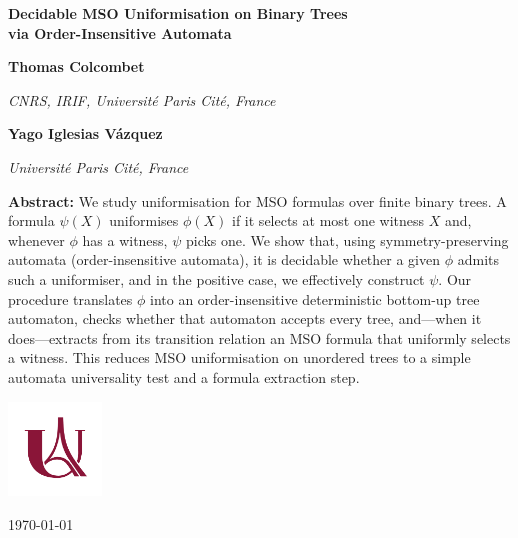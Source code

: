 \documentclass[twoside]{article}
\newcommand{\paperauthorone}{Thomas Colcombet}
\newcommand{\paperaffiliationone}{CNRS, IRIF, Université Paris Cité, France}
\newcommand{\paperauthortwo}{Yago Iglesias Vázquez}
\newcommand{\paperaffiliationtwo}{Université Paris Cité, France}
\begin{document}
\begin{titlingpage}
	\begin{center}
		{\LARGE \bfseries Decidable MSO Uniformisation on Binary Trees\\ via Order-Insensitive Automata\par}

		\vspace{2em}

		{\bfseries \paperauthorone \par}
		{\itshape \paperaffiliationone \par}
		\vspace{1em}

		{\bfseries \paperauthortwo \par}
		{\itshape \paperaffiliationtwo \par}

		\vspace{3em}

		\begin{minipage}{0.8\textwidth}
			\noindent
			\textbf{Abstract:}
			\small
			We study uniformisation for MSO formulas over finite binary trees. A formula $\psi(X)$ uniformises $\phi(X)$
			if it selects at most one witness $X$ and, whenever $\phi$ has a witness, $\psi$ picks one. We show that,
			using symmetry-preserving automata (order-insensitive automata), it is decidable whether a
			given $\phi$ admits such a uniformiser, and in the positive case, we effectively construct $\psi$. Our procedure translates $\phi$ into
			an order-insensitive deterministic bottom-up tree automaton, checks whether that automaton accepts every tree, and—when
			it does—extracts from its transition relation an MSO formula that uniformly selects a witness. This reduces MSO uniformisation
			on unordered trees to a simple automata universality test and a formula extraction step.
		\end{minipage}

		\vfill

		\includegraphics[height=2.5cm]{images/logo-paris-cite.png}

		\vspace{1em}

		{\large \monthyeardate\today \par}
	\end{center}
\end{titlingpage}
\end{document}
